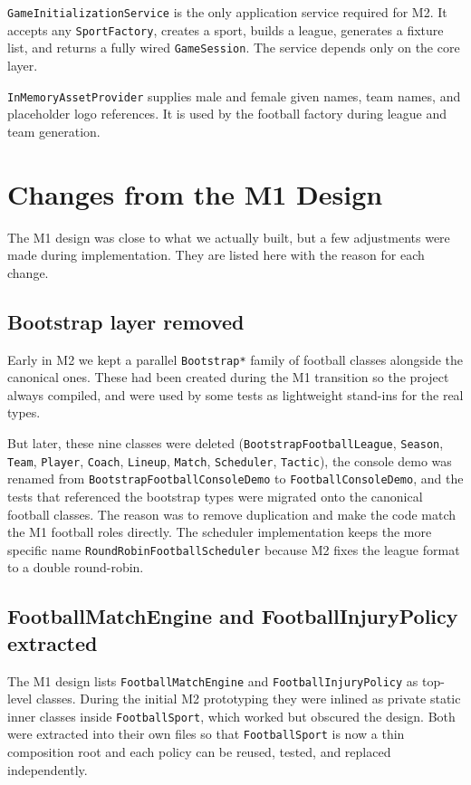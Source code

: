 \documentclass[11pt, a4paper]{article}
\newcommand{\code}[1]{\texttt{#1}}
\begin{document}
\code{GameInitializationService} is the only application service required
for M2. It accepts any \code{SportFactory}, creates a sport, builds a
league, generates a fixture list, and returns a fully wired
\code{GameSession}. The service depends only on the core layer.

\code{InMemoryAssetProvider} supplies male and female given names, team
names, and placeholder logo references. It is used by the football factory
during league and team generation.

\section{Changes from the M1 Design}

The M1 design was close to what we actually built, but a few adjustments
were made during implementation. They are listed here with the reason for
each change.

\subsection{Bootstrap layer removed}

Early in M2 we kept a parallel \code{Bootstrap*} family of football
classes alongside the canonical ones. These had been created during the
M1 transition so the project always compiled, and were used by some
tests as lightweight stand-ins for the real types.

But later, these nine classes were deleted
(\code{BootstrapFootballLeague}, \code{Season}, \code{Team}, \code{Player},
\code{Coach}, \code{Lineup}, \code{Match}, \code{Scheduler},
\code{Tactic}), the console demo was renamed from
\code{BootstrapFootballConsoleDemo} to \code{FootballConsoleDemo}, and the
tests that referenced the bootstrap types were migrated onto the canonical
football classes. The reason was to remove duplication and make the code
match the M1 football roles directly. The scheduler implementation keeps
the more specific name \code{RoundRobinFootballScheduler} because M2 fixes
the league format to a double round-robin.

\subsection{FootballMatchEngine and FootballInjuryPolicy extracted}

The M1 design lists \code{FootballMatchEngine} and \code{FootballInjuryPolicy}
as top-level classes. During the initial M2 prototyping they were inlined as
private static inner classes inside \code{FootballSport}, which worked but
obscured the design. Both were extracted into their own files so that
\code{FootballSport} is now a thin composition root and each policy can be
reused, tested, and replaced independently.
\end{document}
